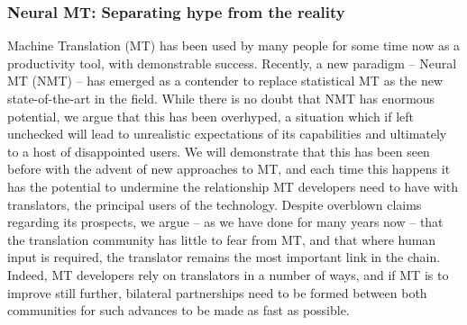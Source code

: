\subsubsection*{Neural MT: Separating hype from the reality}

Machine Translation (MT) has been used by many people for some time now as a productivity tool, with demonstrable success. 
Recently, a new paradigm -- Neural MT (NMT) -- has emerged as a contender to replace statistical MT as the new state-of-the-art in the field. 
While there is no doubt that NMT has enormous potential, we argue that this has been overhyped, a situation which if left unchecked will lead to unrealistic expectations of its capabilities and ultimately to a host of disappointed users. 
We will demonstrate that this has been seen before with the advent of new approaches to MT, and each time this happens it has the potential to undermine the relationship MT developers need to have with translators, the principal users of the technology. 
Despite overblown claims regarding its prospects, we argue -- as we have done for many years now -- that the translation community has little to fear from MT, and that where human input is required, the translator remains the most important link in the chain. 
Indeed, MT developers rely on translators in a number of ways, and if MT is to improve still further, bilateral partnerships need to be formed between both communities for such advances to be made as fast as possible.
